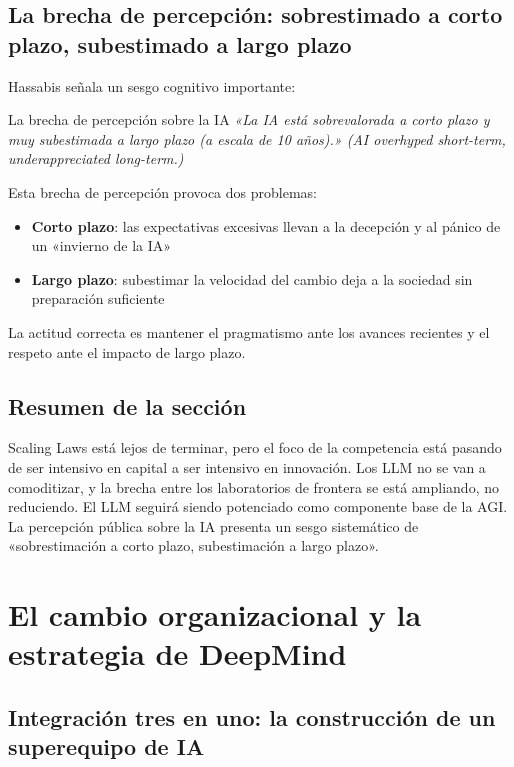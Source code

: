 \documentclass[a4paper]{article}
\begin{document}
\subsection{La brecha de percepción: sobrestimado a corto plazo, subestimado a largo plazo}

Hassabis señala un sesgo cognitivo importante:

\begin{importantbox}{La brecha de percepción sobre la IA}
\textit{«La IA está sobrevalorada a corto plazo y muy subestimada a largo plazo (a escala de 10 años).» (AI overhyped short-term, underappreciated long-term.)}

Esta brecha de percepción provoca dos problemas:
\begin{itemize}
    \item \textbf{Corto plazo}: las expectativas excesivas llevan a la decepción y al pánico de un «invierno de la IA»
    \item \textbf{Largo plazo}: subestimar la velocidad del cambio deja a la sociedad sin preparación suficiente
\end{itemize}
La actitud correcta es mantener el pragmatismo ante los avances recientes y el respeto ante el impacto de largo plazo.
\end{importantbox}

\subsection{Resumen de la sección}

Scaling Laws está lejos de terminar, pero el foco de la competencia está pasando de ser intensivo en capital a ser intensivo en innovación. Los LLM no se van a comoditizar, y la brecha entre los laboratorios de frontera se está ampliando, no reduciendo. El LLM seguirá siendo potenciado como componente base de la AGI. La percepción pública sobre la IA presenta un sesgo sistemático de «sobrestimación a corto plazo, subestimación a largo plazo».

\section{El cambio organizacional y la estrategia de DeepMind}

\subsection{Integración tres en uno: la construcción de un superequipo de IA}
\end{document}
